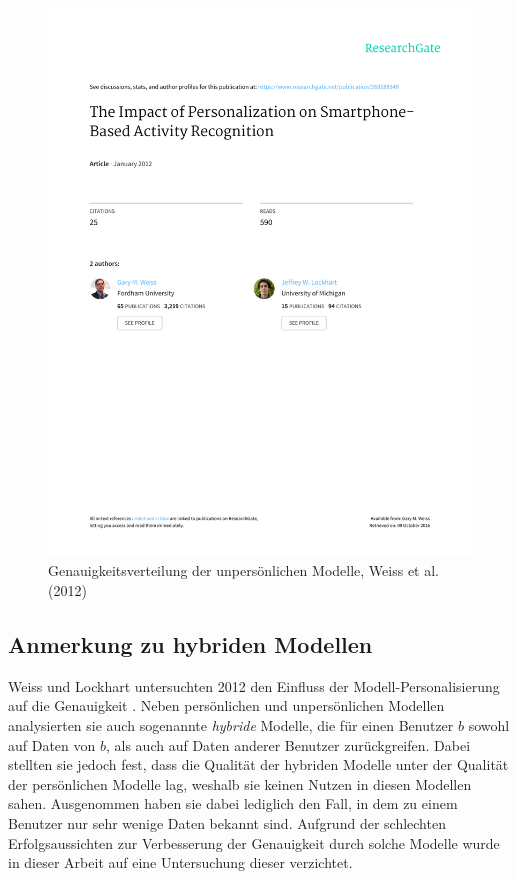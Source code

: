 \begin{figure}
\centering
\includegraphics[clip,trim=110mm 186mm 10mm 55mm, page=6, scale=1]{img/Weiss2012}
\caption{Genauigkeitsverteilung der unpersönlichen Modelle, Weiss et al. (2012) \cite{Weiss2012}}
\label{fig:accuracy-impersonal-per-user-weiss2012}
\end{figure}

\subsection{Anmerkung zu hybriden Modellen}
Weiss und Lockhart untersuchten 2012 den Einfluss der Modell-Personalisierung auf die Genauigkeit \cite{Weiss2012}. Neben persönlichen und unpersönlichen Modellen analysierten sie auch sogenannte \textit{hybride} Modelle, die für einen Benutzer $b$ sowohl auf Daten von $b$, als auch auf Daten anderer Benutzer zurückgreifen. Dabei stellten sie jedoch fest, dass die Qualität der hybriden Modelle unter der Qualität der persönlichen Modelle lag, weshalb sie keinen Nutzen in diesen Modellen sahen. Ausgenommen haben sie dabei lediglich den Fall, in dem zu einem Benutzer nur sehr wenige Daten bekannt sind. Aufgrund der schlechten Erfolgsaussichten zur Verbesserung der Genauigkeit durch solche Modelle wurde in dieser Arbeit auf eine Untersuchung dieser verzichtet.



